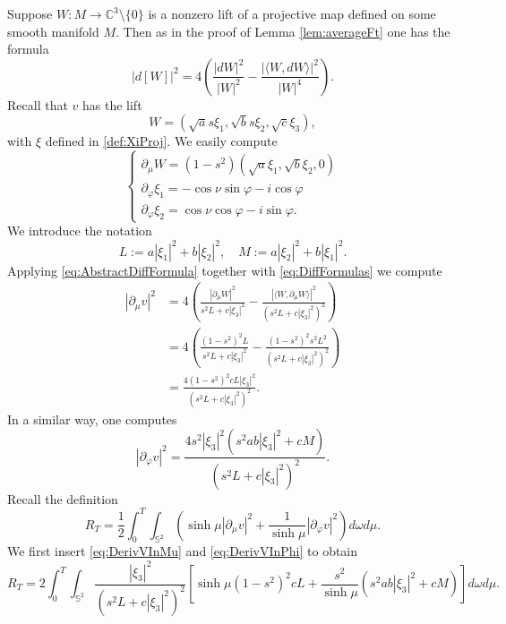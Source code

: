 \documentclass[11pt]{article}
\theoremstyle{plain}
\numberwithin{equation}{section}
\theoremstyle{definition}
\let\oldendproof\endproof
\renewenvironment{proof}[1][\proofname]{%
\oldproof[\upshape \bfseries #1]%
}{\oldendproof}
\def \C{\mathbb{C}}
\def \p{\partial}
\def \mb{\mathbb}
\begin{document}
\begin{proof}
    Suppose $W:M \to \C^3\setminus \{0\}$ is a nonzero lift of a projective map defined on some smooth manifold $M$. Then as in the proof of Lemma \ref{lem:averageFt} one has the formula
    \begin{equation}
        \label{eq:AbstractDiffFormula}
        |d[W]|^2=4\left(\frac{|dW|^2}{|W|^2}-\frac{|\langle W,dW\rangle|^2}{|W|^4}\right).
    \end{equation}
    Recall that $v$ has the lift
    \[
    W=(\sqrt{a}s\xi_1,\sqrt{b}s\xi_2,\sqrt{c}\xi_3),
    \]
    with $\xi$ defined in \eqref{def:XiProj}. We easily compute
    \begin{equation}
        \label{eq:DiffFormulas}
        \begin{cases}
            \p_\mu W=(1-s^2)(\sqrt{a}\xi_1,\sqrt{b}\xi_2,0)\\
            \partial_\varphi \xi_1=-\cos\nu\sin\varphi-i\cos\varphi\\
            \p_\varphi \xi_2=\cos\nu\cos\varphi-i\sin\varphi.
        \end{cases}
    \end{equation}
    We introduce the notation
    \[
    L:=a|\xi_1|^2+b|\xi_2|^2,\quad M:=a|\xi_2|^2+b|\xi_1|^2.
    \]
    Applying \eqref{eq:AbstractDiffFormula} together with \eqref{eq:DiffFormulas} we compute
    \begin{align}
    \label{eq:DerivVInMu}
        |\p_\mu v|^2&=4\left(\frac{|\p_\mu W|^2}{s^2L+c|\xi_3|^2}-\frac{|\langle W,\p_\mu W \rangle|^2}{(s^2L+c|\xi_3|^2)^2}\right) \nonumber \\
        &=4\left(\frac{(1-s^2)^2L}{s^2L+c|\xi_3|^2}-\frac{(1-s^2)^2 s^2 L^2}{(s^2L+c|\xi_3|^2)^2}\right)\nonumber \\
        &=\frac{4(1-s^2)^2cL|\xi_3|^2}{(s^2L+c|\xi_3|^2)^2}.
    \end{align}
    In a similar way, one computes
    \begin{equation}
        \label{eq:DerivVInPhi}
        |\p_\varphi v|^2=\frac{4s^2|\xi_3|^2(s^2ab|\xi_3|^2+cM)}{(s^2L+c|\xi_3|^2)^2}.
    \end{equation}
    Recall the definition
    \[
    R_T=\frac12\int_{0}^T\int_{\mb S^2}\left(\sinh \mu|\p_\mu v|^2+\frac{1}{\sinh\mu}|\partial_{\varphi}v|^2\right)d\omega d\mu.
    \]
    We first insert \eqref{eq:DerivVInMu} and \eqref{eq:DerivVInPhi} to obtain
    \[
    R_T=2\int_0^T\int_{\mb S^2}\frac{|\xi_3|^2}{(s^2L+c|\xi_3|^2)^2}\left[\sinh\mu (1-s^2)^2cL+\frac{s^2}{\sinh\mu}(s^2ab|\xi_3|^2+cM)\right]d\omega d\mu.
\]
\end{proof}
\end{document}
